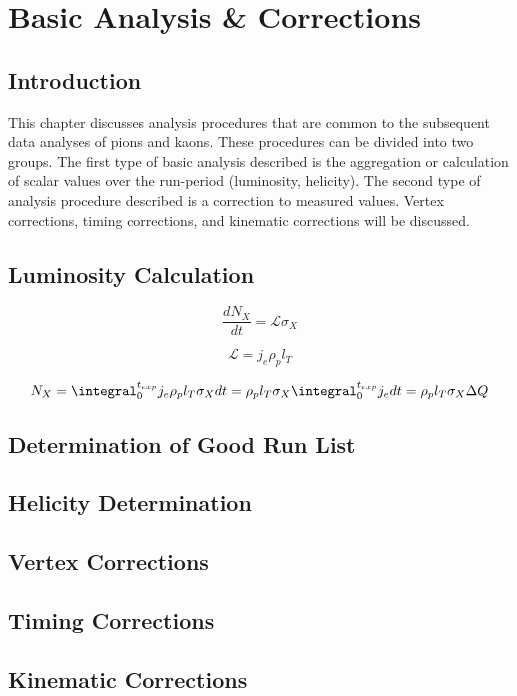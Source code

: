 \chapter{Basic Analysis \& Corrections}

\section{Introduction}
This chapter discusses analysis procedures that are common to the subsequent data analyses of pions and kaons.  These procedures can be divided into two groups.  The first type of basic analysis described is the aggregation or calculation of scalar values over the run-period (luminosity, helicity).  The second type of analysis procedure described is a correction to measured values.  Vertex corrections, timing corrections, and kinematic corrections will be discussed.


\section{Luminosity Calculation}

\begin{equation}
	\frac{dN_X}{dt} = \mathcal{L} \sigma_X 
\end{equation}

\begin{equation}
	\mathcal{L} = j_e \rho_p l_T 
\end{equation}

\begin{equation}
	N_X = \integral_{0}^{t_{exp}} j_e \rho_p l_T \sigma_X dt = \rho_p l_T \sigma_X \integral_{0}^{t_{exp}} j_e dt =  \rho_p l_T \sigma_X \Delta Q
\end{equation}



\section{Determination of Good Run List}

\section{Helicity Determination}

\section{Vertex Corrections}

\section{Timing Corrections}

\section{Kinematic Corrections}
